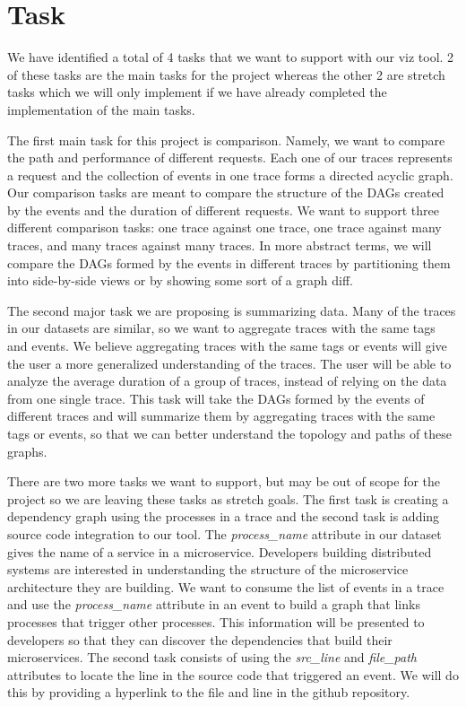 \section{Task}

We have identified a total of 4 tasks that we want to support with our viz tool.
2 of these tasks are the main tasks for the project whereas the other 2 are stretch tasks
which we will only implement if we have already completed the implementation of the main tasks.

The first main task for this project is comparison. Namely, we want to compare the path and performance of different
requests. Each one of our traces represents a request and the collection of events in one trace forms a directed acyclic graph. Our
comparison tasks are meant to compare the structure of the DAGs created by the events and the duration of different requests. 
We want to support three different comparison tasks: one trace against one trace, one trace against many traces, and many traces
against many traces. In more abstract terms, we will compare the DAGs formed by the events in different traces by partitioning them
into side-by-side views or by showing some sort of a graph diff.

The second major task we are proposing is summarizing data. Many of the traces in our datasets are similar, so we want to
aggregate traces with the same tags and events. We believe aggregating traces with the same tags or events will give the user
a more generalized understanding of the traces. The user will be able to analyze the average duration of a group of traces, instead
of relying on the data from one single trace. This task will take the DAGs formed by the events of different traces and will summarize
them by aggregating traces with the same tags or events, so that we can better understand the topology and paths of these graphs.

There are two more tasks we want to support, but may be out of scope for the project so we are leaving these tasks as stretch goals.
The first task is creating a dependency graph using
the processes in a trace and the second task is adding source code integration to our tool. The \textit{process\_name} attribute in 
our dataset gives the name of a service in a microservice.
Developers building distributed systems are interested in understanding the structure of the microservice
architecture they are building. We want to consume the list of events in a trace and use the \textit{process\_name} attribute in an 
event to build a graph that links processes that trigger other processes. This information will be presented to developers so that 
they can discover the dependencies that build their microservices. 
The second task consists of using the \textit{src\_line} and \textit{file\_path}
attributes to locate the line in the source code that triggered an event. We will do this by providing a hyperlink to the file and line
in the github repository. 